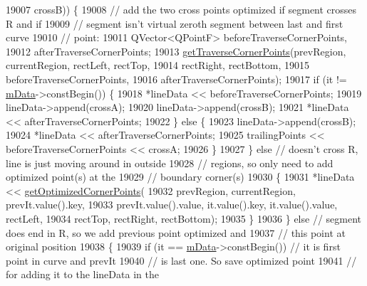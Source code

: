 \begin{DoxyCode}
{19007                                crossB)) \{
19008           \textcolor{comment}{// add the two cross points optimized if segment crosses R and if}
19009           \textcolor{comment}{// segment isn't virtual zeroth segment between last and first curve}
19010           \textcolor{comment}{// point:}
19011           QVector<QPointF> beforeTraverseCornerPoints,
19012               afterTraverseCornerPoints;
19013           \hyperlink{class_q_c_p_curve_abe1721b19669e7127d76d144660fbeb8}{getTraverseCornerPoints}(prevRegion, currentRegion, rectLeft, rectTop,
19014                                   rectRight, rectBottom,
19015                                   beforeTraverseCornerPoints,
19016                                   afterTraverseCornerPoints);
19017           \textcolor{keywordflow}{if} (it != \hyperlink{class_q_c_p_curve_a88d533e455bca96004b049e99168731b}{mData}->constBegin()) \{
19018             *lineData << beforeTraverseCornerPoints;
19019             lineData->append(crossA);
19020             lineData->append(crossB);
19021             *lineData << afterTraverseCornerPoints;
19022           \} \textcolor{keywordflow}{else} \{
19023             lineData->append(crossB);
19024             *lineData << afterTraverseCornerPoints;
19025             trailingPoints << beforeTraverseCornerPoints << crossA;
19026           \}
19027         \} \textcolor{keywordflow}{else} \textcolor{comment}{// doesn't cross R, line is just moving around in outside}
19028                \textcolor{comment}{// regions, so only need to add optimized point(s) at the}
19029                \textcolor{comment}{// boundary corner(s)}
19030         \{
19031           *lineData << \hyperlink{class_q_c_p_curve_aad0b69d9a7a2a5367fcc9fe3edaf9bf4}{getOptimizedCornerPoints}(
19032               prevRegion, currentRegion, prevIt.value().key,
19033               prevIt.value().value, it.value().key, it.value().value, rectLeft,
19034               rectTop, rectRight, rectBottom);
19035         \}
19036       \} \textcolor{keywordflow}{else} \textcolor{comment}{// segment does end in R, so we add previous point optimized and}
19037              \textcolor{comment}{// this point at original position}
19038       \{
19039         \textcolor{keywordflow}{if} (it == \hyperlink{class_q_c_p_curve_a88d533e455bca96004b049e99168731b}{mData}->constBegin()) \textcolor{comment}{// it is first point in curve and prevIt}
19040                                        \textcolor{comment}{// is last one. So save optimized point}
19041                                        \textcolor{comment}{// for adding it to the lineData in the}
}
\end{DoxyCode}
